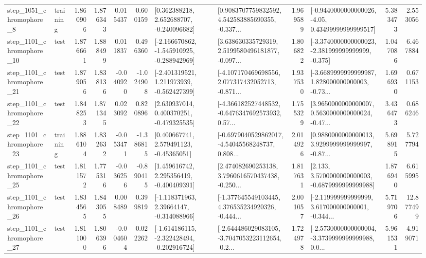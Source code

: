 \begin{tabular}{llrrrrllrlrr}
  step\_1051\_chromophore\_8 &  training &      1.860906 &    1.876343 &      0.015437 &  0.600159 &    [0.362388218, 2.652688707, -0.240096682] &  [0.9083707759832592, 4.542583885690355, -0.337... &       1.969589 &  [-0.9440000000000026, -4.05, 0.43499999999999517] &            5.383473 &          2.553056 \\
 step\_1101\_chromophore\_10 &      test &      1.876661 &    1.888499 &      0.011837 &  0.496360 &  [-2.166670862, -1.545910925, -0.288942969] &  [3.638630335729319, 2.5199580496181877, -0.097... &       1.806822 &  [-3.3740000000000023, -2.381999999999999, -0.375] &            1.047086 &          6.467884 \\
 step\_1101\_chromophore\_21 &      test &      1.879056 &    1.838136 &     -0.040920 & -1.024908 &   [-2.401319521, 1.211973939, -0.562427399] &  [-4.107170469698556, 2.077317432052713, -0.871... &       1.937530 &  [-3.6689999999999987, 1.828000000000003, -0.73... &            1.696930 &          0.671153 \\
 step\_1101\_chromophore\_22 &      test &      1.848253 &    1.871345 &      0.023092 &  0.820896 &    [2.630937014, 0.400370251, -0.479325535] &  [-4.366182527448532, -0.6476347692573932, 0.57... &       1.755329 &  [3.9650000000000007, 0.5630000000000024, -0.47... &            3.436473 &          0.686246 \\
 step\_1101\_chromophore\_23 &  training &      1.886104 &    1.832632 &     -0.053471 & -1.386815 &     [0.400667741, 2.579491123, -0.45365051] &  [-0.6979040529862017, -4.54045568248737, 0.808... &       2.014926 &  [0.9880000000000013, 3.9299999999999997, -0.87... &            5.698915 &          5.727794 \\
 step\_1101\_chromophore\_25 &      test &      1.811572 &    1.775316 &     -0.036256 & -0.890415 &    [1.459616742, 2.295356419, -0.400409391] &  [2.474082690253138, 3.7960616570437438, -0.250... &       1.817631 &   [2.133, 3.5700000000000003, -0.6879999999999988] &            1.876940 &          6.615995 \\
 step\_1101\_chromophore\_26 &      test &      1.834565 &    1.843055 &      0.008489 &  0.399819 &    [-1.118371963, 2.39664147, -0.314088966] &  [-1.377645549103445, 4.376535234920326, -0.444... &       2.001057 &  [-2.119999999999999, 3.617000000000001, -0.344... &            5.719706 &         12.877499 \\
 step\_1101\_chromophore\_27 &      test &      1.811000 &    1.806396 &     -0.004604 &  0.022262 &  [-1.614186115, -2.322428494, -0.202916724] &  [-2.644486029083105, -3.7047053223112654, -0.2... &       1.724978 &  [-2.5730000000000004, -3.3739999999999988, 0.0... &            5.961531 &          4.919071 \\

\end{tabular}
